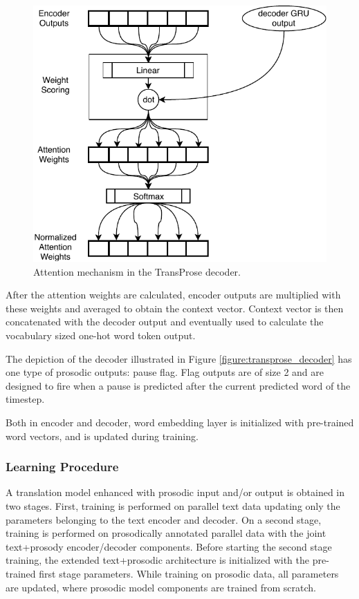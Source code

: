 
\begin{figure}
\centering
\includegraphics[width=0.7\linewidth]{img/TransProse_attn.pdf}
\caption{Attention mechanism in the TransProse decoder.}
\label{figure:transprose_attn}
\end{figure}

After the attention weights are calculated, encoder outputs are multiplied with these weights and averaged to obtain the context vector. Context vector is then concatenated with the decoder output and eventually used to calculate the vocabulary sized one-hot word token output. 

The depiction of the decoder illustrated in Figure \ref{figure:transprose_decoder} has one type of prosodic outputs: pause flag.
Flag outputs are of size 2 and are designed to fire when a pause is predicted after the current predicted word of the timestep. 

Both in encoder and decoder, word embedding layer is initialized with pre-trained word vectors, and is updated during training. 

\subsubsection{Learning Procedure}
A translation model enhanced with prosodic input and/or output is obtained in two stages. First, training is performed on parallel text data updating only the parameters belonging to the text encoder and decoder. On a second stage, training is performed on prosodically annotated parallel data with the joint text+prosody encoder/decoder components. Before starting the second stage training, the extended text+prosodic architecture is initialized with the pre-trained first stage parameters. While training on prosodic data, all parameters are updated, where prosodic model components are trained from scratch. 

